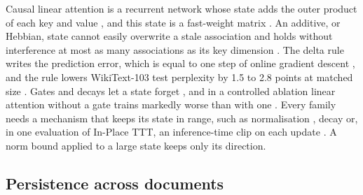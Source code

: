 \documentclass[10pt]{article} %
\begin{document}
Causal linear attention is a recurrent network whose state adds the outer product of each key and value \citep{katharopoulos2020transformers}, and this state is a fast-weight matrix \citep{schlag2021linear}. An additive, or Hebbian, state cannot easily overwrite a stale association and holds without interference at most as many associations as its key dimension \citep{schlag2021linear,yang2024deltanet}. The delta rule \citep{widrow1960adaptive} writes the prediction error, which is equal to one step of online gradient descent \citep{yang2024deltanet}, and the rule lowers WikiText-103 test perplexity by 1.5 to 2.8 points at matched size \citep{schlag2021linear}. Gates and decays let a state forget \citep{ba2016using,mao2022finetuning,yang2025gated}, and in a controlled ablation linear attention without a gate trains markedly worse than with one \citep{yang2024gla}. Every family needs a mechanism that keeps its state in range, such as normalisation \citep{zhang2025test}, decay \citep{ba2016using} or, in one evaluation of In-Place TTT, an inference-time clip on each update \citep{feng2026inplace}. A norm bound applied to a large state keeps only its direction.

\subsection{Persistence across documents}
\end{document}
